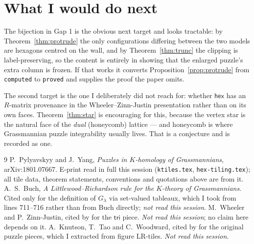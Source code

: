 \documentclass[11pt]{article}
\theoremstyle{definition}
\newcommand{\hex}{\mathsf{hex}}
\newcommand{\tritile}{\mathsf{tri}}
\newcommand{\la}{\lambda}
\begin{document}
\section{What I would do next}

The bijection in Gap 1 is the obvious next target and looks tractable: by
Theorem~\ref{thm:protrude} the only configurations differing between the two
models are hexagons centred on the wall, and by Theorem~\ref{thm:trunc} the
clipping is label-preserving, so the content is entirely in showing that the
enlarged puzzle's extra column is frozen. If that works it converts
Proposition~\ref{prop:protrude} from \texttt{computed} to \texttt{proved} and
supplies the proof the paper omits.

The second target is the one I deliberately did not reach for: whether $\hex$
has an $R$-matrix provenance in the Wheeler--Zinn-Justin presentation rather
than on its own faces. Theorem~\ref{thm:star} is encouraging for this, because
the vertex star is the natural face of the \emph{dual} (honeycomb) lattice ---
and honeycomb is where Grassmannian puzzle integrability usually lives. That is
a conjecture and is recorded as one.

\begin{thebibliography}{9}
 P.~Pylyavskyy and J.~Yang, \emph{Puzzles in $K$-homology of
Grassmannians}, arXiv:1801.07667. E-print read in full this session
(\texttt{ktiles.tex}, \texttt{hex-tiling.tex}); all tile data, theorem
statements, conventions and quotations above are from it.
 A.~S.~Buch, \emph{A Littlewood--Richardson rule for the
$K$-theory of Grassmannians}. Cited only for the definition of $G_\la$ via
set-valued tableaux, which I took from \cite{PY} lines 711--716 rather than from
Buch directly; \emph{not read this session}.
 M.~Wheeler and P.~Zinn-Justin, cited by \cite{PY} for the
$\tritile$ piece. \emph{Not read this session}; no claim here depends on it.
 A.~Knutson, T.~Tao and C.~Woodward, cited by \cite{PY} for the
original puzzle pieces, which I extracted from \cite{PY} figure LR-tiles.
\emph{Not read this session.}
\end{thebibliography}
\end{document}

